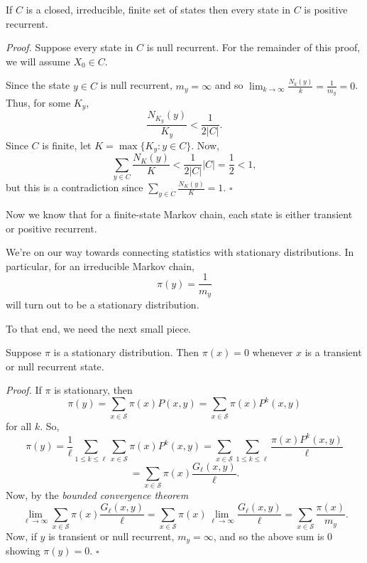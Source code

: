 \documentclass{problemset}
\newcommand{\1}{\mathbf{1}}
\newenvironment{proof}{\emph{Proof.}}{\hfill$\square$}
\begin{document}
	\begin{theorem}
		If $C$ is a closed, irreducible, finite set of states then every state in $C$ is positive recurrent.
	\end{theorem}
	\begin{proof}
		Suppose every state in $C$ is null recurrent.  For the remainder of this proof, we will
		assume $X_0\in C$.

		Since the state $y\in C$ is null recurrent, $m_y=\infty$ and so
		$\lim_{k\to\infty} \frac{N_k(y)}{k}=\frac{1}{m_y}=0$.  Thus, for some $K_y$, 
		\[
			\frac{N_{K_y}(y)}{K_y} < \frac{1}{2|C|}.
		\]
		Since $C$ is finite, let $K=\max\{K_y:y\in C\}$.  Now,
		\[
			\sum_{y\in C} \frac{N_K(y)}{K} < \frac{1}{2|C|}|C|=\frac{1}{2} < 1,
		\]
		but this is a contradiction since $\sum_{y\in C} \frac{N_K(y)}{K}=1$.
	\end{proof}

	Now we know that for a finite-state Markov chain, each state is either transient or positive recurrent.

	We're on our way towards connecting statistics with stationary distributions.  In particular, for 
	an irreducible Markov chain,
	\[
		\pi(y) = \frac{1}{m_y}
	\]
	will turn out to be a stationary distribution.

	To that end, we need the next small piece.

	\begin{theorem}
		Suppose $\pi$ is a stationary distribution.  Then $\pi(x)=0$ whenever $x$ is a 
		transient or null recurrent state.
	\end{theorem}
	\begin{proof}
		If $\pi$ is stationary, then
		\[
			\pi(y) = \sum_{x\in\mathcal S} \pi(x)P(x,y)=\sum_{x\in\mathcal S} \pi(x)P^k(x,y)
		\]
		for all $k$.  So,
		\[
			\pi(y) = \frac{1}{\ell}\sum_{1\leq k\leq \ell} \sum_{x\in\mathcal S} \pi(x)P^k(x,y)
			=\sum_{x\in\mathcal S} \sum_{1\leq k\leq \ell} \frac{\pi(x)P^k(x,y)}{\ell}
		\]\[
			=\sum_{x\in\mathcal S} \pi(x)\frac{G_\ell(x,y)}{\ell}.
		\]
		Now, by the \emph{bounded convergence theorem}
		\[
			\lim_{\ell\to\infty} \sum_{x\in\mathcal S} \pi(x)\frac{G_\ell(x,y)}{\ell}
			=
			\sum_{x\in\mathcal S} \pi(x)\lim_{\ell\to\infty} \frac{G_\ell(x,y)}{\ell}
			=\sum_{x\in\mathcal S} \frac{\pi(x)}{m_y}.
		\]
		Now, if $y$ is transient or null recurrent, $m_y=\infty$, and so the above sum is $0$ showing
		$\pi(y)=0$.
	\end{proof}
\end{document}
